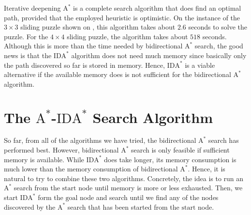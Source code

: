 Iterative deepening $\mathrm{A}^*$ is a complete search algorithm that does find an optimal path, provided that the employed heuristic
is optimistic.  On the instance of the $3 \times 3$ sliding puzzle shown on , this
algorithm takes about $2.6$ seconds to solve the puzzle.  For the $4 \times 4$ sliding puzzle, the algorithm
takes about $518$ seconds.  Although this is more than the time needed by bidirectional $\mathrm{A}^*$ search,
the good news is that the $\mathrm{IDA}^*$ algorithm does not need much memory since basically only the path
discovered so far is stored in memory.  Hence, $\mathrm{IDA}^*$ is a viable alternative if the available memory
does is not sufficient for the bidirectional $\mathrm{A}^*$ algorithm.

\section{The $\mathrm{A}^*$-$\mathrm{IDA}^*$ Search Algorithm}
So far, from all of the algorithms we have tried, the bidirectional $\mathrm{A}^*$ search has performed best.  However,
bidirectional $\mathrm{A}^*$ search is only feasible if sufficient memory is available.   While
$\mathrm{IDA}^*$ does take longer, its memory consumption is much lower than the memory consumption of
bidirectional $\mathrm{A}^*$.  Hence, it is natural to try to combine these two algorithms.  Concretely, the
idea is to run an $\mathrm{A}^*$ search from the $\mathrm{start}$ node until memory is more or less
exhausted.  Then, we start $\mathrm{IDA}^*$ form the $\mathrm{goal}$ node and search until we find any of the
nodes discovered by the $\mathrm{A}^*$ search that has been started from the $\mathrm{start}$ node.

